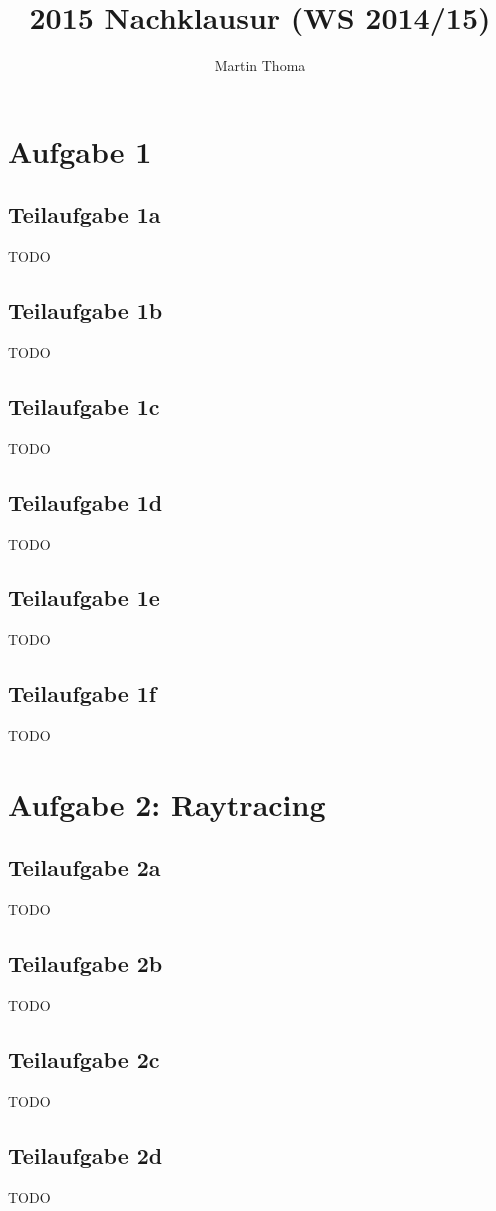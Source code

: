 \documentclass[a4paper]{scrartcl}
\begin{document}
\title{2015 Nachklausur (WS 2014/15)}
\author{Martin Thoma}

\setcounter{section}{1}
\section*{Aufgabe 1}
\subsection*{Teilaufgabe 1a}
TODO
\subsection*{Teilaufgabe 1b}
TODO
\subsection*{Teilaufgabe 1c}
TODO
\subsection*{Teilaufgabe 1d}
TODO
\subsection*{Teilaufgabe 1e}
TODO
\subsection*{Teilaufgabe 1f}
TODO

\section*{Aufgabe 2: Raytracing}
\subsection*{Teilaufgabe 2a}
TODO
\subsection*{Teilaufgabe 2b}
TODO
\subsection*{Teilaufgabe 2c}
TODO
\subsection*{Teilaufgabe 2d}
TODO
\end{document}
